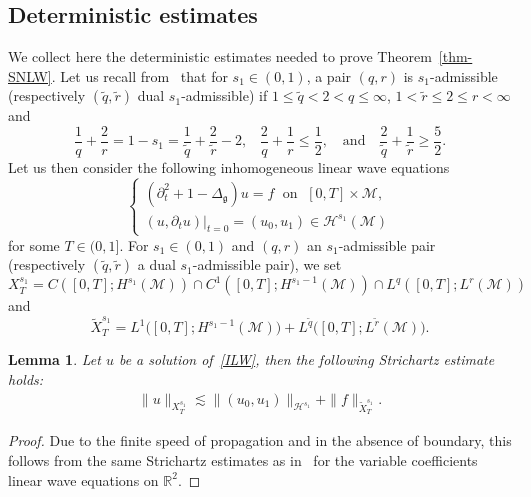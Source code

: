 \documentclass[10pt]{amsart}
\newtheorem{lemm}[theo]{Lemma}\newtheorem{prop}[theo]{Proposition}\newtheorem{coro}[theo]{Corollary}\newtheorem{conj}[theo]{Conjecture}
\theoremstyle{definition}\newtheorem{defi}[theo]{Definition}\newtheorem{rema}[theo]{Remark}\newtheorem{exam}[theo]{Example}\newtheorem{exem}[theo]{Example}\newtheorem{nota}[theo]{Notation}
\newcommand{\R}{\mathbb{R}}
\newcommand{\M}{\mathcal{M}}
\renewcommand{\H}{\mathcal{H}}
\newcommand{\g}{\mathfrak{g}}
\newcommand{\Dlg}{\Delta_{\g}}
\newcommand{\dt}{\partial_t}
\newcommand{\les}{\lesssim}
\begin{document}
\subsection{Deterministic estimates}
We collect here the deterministic estimates needed to prove Theorem~\ref{thm-SNLW}. Let us recall from~\cite{GKO} that for $s_1\in (0,1)$, a pair $(q,r)$ is $s_1$-admissible (respectively $(\widetilde{q},\widetilde{r})$ dual $s_1$-admissible) if $1\leq \widetilde{q}<2<q\leq\infty$, $1<\widetilde{r}\leq 2 \leq r <\infty$ and
\begin{equation*}
\frac{1}{q}+\frac{2}{r}=1-s_1=\frac{1}{\widetilde{q}}+\frac{2}{\widetilde{r}}-2,\hspace{10pt}\frac{2}{q}+\frac{1}{r}\leq\frac12,\quad\text{and}\quad\frac{2}{\widetilde{q}}+\frac{1}{\widetilde{r}}\geq\frac52.
\end{equation*}
Let us then consider the following inhomogeneous linear wave equations
\begin{equation}\label{ILW}
\begin{cases}
\left(\dt^2+1-\Dlg\right)u = f\; \text{ on }\;[0,T]\times\M,\\
\left(u,\dt u\right)\big|_{t=0}=(u_0,u_1)\in \H^{s_1}(\M)
\end{cases}
\end{equation}
for some $T\in (0,1]$. For $s_1\in (0,1)$ and $(q,r)$ an $s_1$-admissible pair (respectively $(\widetilde{q},\widetilde{r})$ a dual $s_1$-admissible pair), we set
\begin{equation}\label{def-X}
X^{s_1}_T= C\left([0,T];H^{s_1}(\M)\right)\cap C^1\left([0,T];H^{s_1-1}(\M)\right)\cap L^q\left([0,T];L^r(\M)\right)
\end{equation}
and
\begin{equation*}
\widetilde{X}^{s_1}_T= L^1\big([0,T];H^{s_1-1}(\M)\big)+ L^{\widetilde{q}}\big([0,T];L^{\widetilde{r}}(\M)\big).
\end{equation*}

\begin{lemm}\label{lem-strichartz}
Let $u$ be a solution of~\eqref{ILW}, then the following Strichartz estimate holds:
\begin{align}\label{Strichartz}
\|u\|_{X^{s_1}_T}\les \|(u_0,u_1)\|_{\H^{s_1}}+\|f\|_{\widetilde{X}^{s_1}_T}.
\end{align}
\end{lemm}

\begin{proof}
Due to the finite speed of propagation and in the absence of boundary, this follows from the same Strichartz estimates as in~\cite{K,MSS} for the variable coefficients linear wave equations on $\R^2$.
\end{proof}
\end{document}
